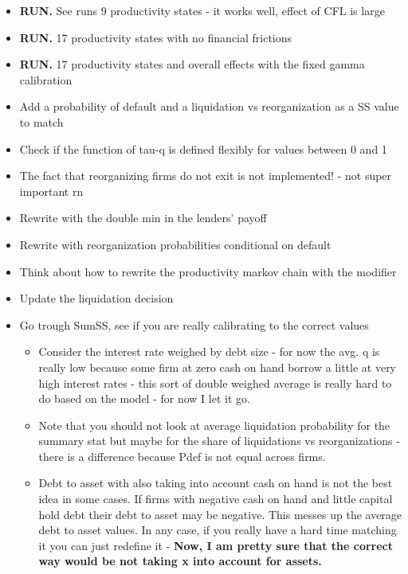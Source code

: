 \documentclass[12pt]{article}
\begin{document}
\begin{itemize}
    \item \textbf{RUN.} See runs 9 productivity states - it works well, effect of CFL is large \checkmark
    \item \textbf{RUN.} 17 productivity states with no financial frictions \checkmark
    \item \textbf{RUN.} 17 productivity states and overall effects with the fixed gamma calibration \checkmark
    \item Add a probability of default and a liquidation vs reorganization as a SS value to match
    \item Check if the function of tau-q is defined flexibly for values between 0 and 1 \checkmark
    \item The fact that reorganizing firms do not exit is not implemented! - not super important rn \checkmark
    \item Rewrite with the double min in the lenders' payoff \checkmark
    \item Rewrite with reorganization probabilities conditional on default \checkmark
    \item Think about how to rewrite the productivity markov chain with the modifier   \checkmark
    \item Update the liquidation decision \checkmark
    \item Go trough SumSS, see if you are really calibrating to the correct values \checkmark
    \begin{itemize}
        \item Consider the interest rate weighed by debt size - for now the avg. q is really low because some firm at zero cash on hand borrow a little at very high interest rates - this sort of double weighed average is really hard to do based on the model - for now I let it go. \checkmark
        \item Note that you should not look at average liquidation probability for the summary stat but maybe for the share of liquidations vs reorganizations - there is a difference because Pdef is not equal across firms.  \checkmark
        \item Debt to asset with also taking into account cash on hand is not the best idea in some cases. If firms with negative cash on hand and little capital hold debt their debt to asset may be negative. This messes up the average debt to asset values. In any case, if you really have a hard time matching it you can just redefine it - \textbf{Now, I am pretty sure that the correct way would be not taking x into account for assets.} \checkmark

\end{itemize}
\end{itemize}
\end{document}
